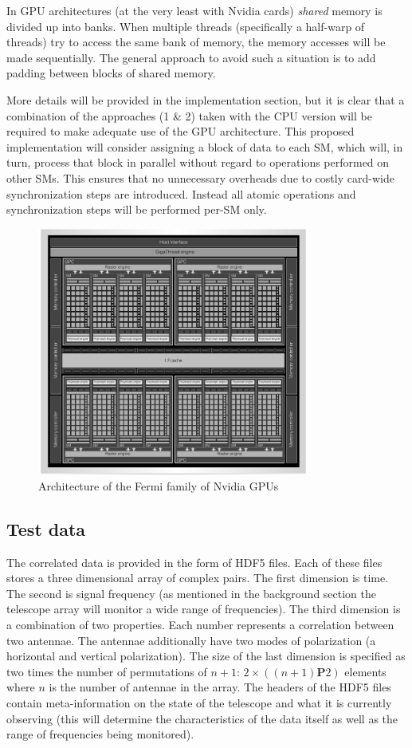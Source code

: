In GPU architectures (at the very least with Nvidia cards) \emph{shared} memory is divided up into banks. When multiple threads (specifically a half-warp of threads) try to 
access the same bank of memory, the memory accesses will be made sequentially. The general approach to avoid such a situation is to add padding between blocks of shared memory.

More details will be provided in the implementation section, but it is clear that a combination of the approaches (1 \& 2) taken with the CPU version will be required to make 
adequate use of the GPU architecture. This proposed implementation will consider assigning a block of data to each SM, which will, in turn, process that block in parallel without 
regard to operations performed on other SMs. This ensures that no unnecessary overheads due to costly card-wide synchronization steps are introduced. Instead all atomic 
operations and synchronization steps will be performed per-SM only.
\begin{figure}[h!]
 \centering
 \includegraphics[width=0.8\textwidth]{fermi_arch.png}
 \caption{Architecture of the Fermi family of Nvidia GPUs \cite{wittenbrink2011fermi}}
 \label{FERMI_ARCH}
\end{figure}
\subsection{Test data}
The correlated data is provided in the form of HDF5 files. Each of these files stores a three dimensional array of complex pairs. The first dimension is time. The second 
is signal frequency (as mentioned in the background section the telescope array will monitor a wide range of frequencies). The third dimension is a combination of two 
properties. Each number represents a correlation between two antennae. The antennae additionally have two modes of polarization (a horizontal and vertical polarization). 
The size of the last dimension is specified as two times the number of permutations of $n + 1$: $2\times((n+1)\mathbf{P}2)$ elements where $n$ is the number of
antennae in the array. The headers of the HDF5 files contain meta-information on the state of the telescope and what it is currently observing (this will determine the 
characteristics of the data itself as well as the range of frequencies being monitored). 

